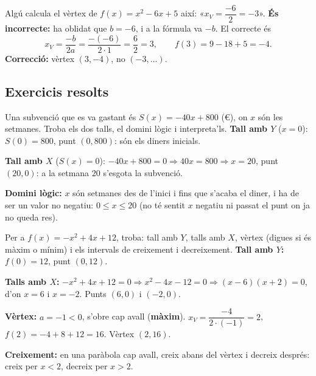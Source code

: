 \begin{exemple}
Algú calcula el vèrtex de $f(x)=x^2-6x+5$ així: «$x_V=\dfrac{-6}{2}=-3$».
\textbf{És incorrecte:} ha oblidat que $b=-6$, i a la fórmula va $-b$. El correcte és
\[
x_V=\frac{-b}{2a}=\frac{-(-6)}{2\cdot 1}=\frac{6}{2}=3,\qquad
f(3)=9-18+5=-4.
\]
\textbf{Correcció:} vèrtex $(3,-4)$, no $(-3,\dots)$.
\end{exemple}

\subsection{Exercicis resolts}

\begin{exresolt}
Una subvenció que es va gastant és $S(x)=-40x+800$ (€), on $x$ són les setmanes.
Troba els dos talls, el domini lògic i interpreta'ls.
\solucio
\textbf{Tall amb $Y$} ($x=0$): $S(0)=800$, punt $(0,800)$: són els diners inicials.

\textbf{Tall amb $X$} ($S(x)=0$): $-40x+800=0 \Rightarrow 40x=800 \Rightarrow x=20$,
punt $(20,0)$: a la setmana $20$ s'esgota la subvenció.

\textbf{Domini lògic:} $x$ són setmanes des de l'inici i fins que s'acaba el diner,
i ha de ser un valor no negatiu: $0\le x\le 20$ (no té sentit $x$ negatiu ni passat
el punt on ja no queda res).
\end{exresolt}

\begin{exresolt}
Per a $f(x)=-x^2+4x+12$, troba: tall amb $Y$, talls amb $X$, vèrtex (digues si és
màxim o mínim) i els intervals de creixement i decreixement.
\solucio
\textbf{Tall amb $Y$:} $f(0)=12$, punt $(0,12)$.

\textbf{Talls amb $X$:} $-x^2+4x+12=0 \Rightarrow x^2-4x-12=0 \Rightarrow (x-6)(x+2)=0$,
d'on $x=6$ i $x=-2$. Punts $(6,0)$ i $(-2,0)$.

\textbf{Vèrtex:} $a=-1<0$, s'obre cap avall (\textbf{màxim}).
$x_V=\dfrac{-4}{2\cdot(-1)}=2$, $f(2)=-4+8+12=16$. Vèrtex $(2,16)$.

\textbf{Creixement:} en una paràbola cap avall, creix abans del vèrtex i decreix
després: creix per $x<2$, decreix per $x>2$.
\end{exresolt}

